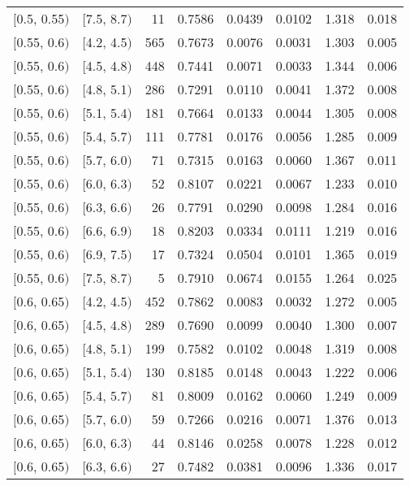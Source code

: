 \begin{longtable}{| l | l | r | r | r | r | r | r |}
        $[$0.5, 0.55$)$ & $[$7.5, 8.7$)$ & 11 & 0.7586 & 0.0439 & 0.0102 & 1.318 & 0.018 \\
        $[$0.55, 0.6$)$ & $[$4.2, 4.5$)$ & 565 & 0.7673 & 0.0076 & 0.0031 & 1.303 & 0.005 \\
        $[$0.55, 0.6$)$ & $[$4.5, 4.8$)$ & 448 & 0.7441 & 0.0071 & 0.0033 & 1.344 & 0.006 \\
        $[$0.55, 0.6$)$ & $[$4.8, 5.1$)$ & 286 & 0.7291 & 0.0110 & 0.0041 & 1.372 & 0.008 \\
        $[$0.55, 0.6$)$ & $[$5.1, 5.4$)$ & 181 & 0.7664 & 0.0133 & 0.0044 & 1.305 & 0.008 \\
        $[$0.55, 0.6$)$ & $[$5.4, 5.7$)$ & 111 & 0.7781 & 0.0176 & 0.0056 & 1.285 & 0.009 \\
        $[$0.55, 0.6$)$ & $[$5.7, 6.0$)$ & 71 & 0.7315 & 0.0163 & 0.0060 & 1.367 & 0.011 \\
        $[$0.55, 0.6$)$ & $[$6.0, 6.3$)$ & 52 & 0.8107 & 0.0221 & 0.0067 & 1.233 & 0.010 \\
        $[$0.55, 0.6$)$ & $[$6.3, 6.6$)$ & 26 & 0.7791 & 0.0290 & 0.0098 & 1.284 & 0.016 \\
        $[$0.55, 0.6$)$ & $[$6.6, 6.9$)$ & 18 & 0.8203 & 0.0334 & 0.0111 & 1.219 & 0.016 \\
        $[$0.55, 0.6$)$ & $[$6.9, 7.5$)$ & 17 & 0.7324 & 0.0504 & 0.0101 & 1.365 & 0.019 \\
        $[$0.55, 0.6$)$ & $[$7.5, 8.7$)$ & 5 & 0.7910 & 0.0674 & 0.0155 & 1.264 & 0.025 \\
        $[$0.6, 0.65$)$ & $[$4.2, 4.5$)$ & 452 & 0.7862 & 0.0083 & 0.0032 & 1.272 & 0.005 \\
        $[$0.6, 0.65$)$ & $[$4.5, 4.8$)$ & 289 & 0.7690 & 0.0099 & 0.0040 & 1.300 & 0.007 \\
        $[$0.6, 0.65$)$ & $[$4.8, 5.1$)$ & 199 & 0.7582 & 0.0102 & 0.0048 & 1.319 & 0.008 \\
        $[$0.6, 0.65$)$ & $[$5.1, 5.4$)$ & 130 & 0.8185 & 0.0148 & 0.0043 & 1.222 & 0.006 \\
        $[$0.6, 0.65$)$ & $[$5.4, 5.7$)$ & 81 & 0.8009 & 0.0162 & 0.0060 & 1.249 & 0.009 \\
        $[$0.6, 0.65$)$ & $[$5.7, 6.0$)$ & 59 & 0.7266 & 0.0216 & 0.0071 & 1.376 & 0.013 \\
        $[$0.6, 0.65$)$ & $[$6.0, 6.3$)$ & 44 & 0.8146 & 0.0258 & 0.0078 & 1.228 & 0.012 \\
        $[$0.6, 0.65$)$ & $[$6.3, 6.6$)$ & 27 & 0.7482 & 0.0381 & 0.0096 & 1.336 & 0.017 \\

\end{longtable}

